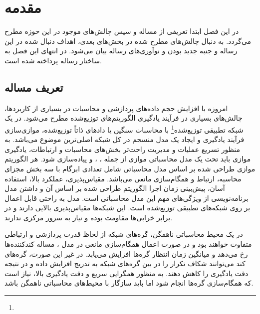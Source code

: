 \chapter{مقدمه}
\newpage
در این فصل ابتدا تعریفی از مساله و سپس چالش‌های موجود در این حوزه مطرح می‌گردد. به دنبال چالش‌های مطرح شده در بخش‌های بعدی، اهداف دنبال شده در این رساله و جنبه‌ جدید بودن و نوآوری‌های رساله بیان می‌شود. در انتهای این فصل به ساختار رساله پرداخته شده است.   
‎\renewcommand{\baselinestretch}{2}\normalsize‎
\label{Introduction}
\section{تعریف مساله}
امروزه با افزایش حجم داده‌های پردازشی و محاسبات در بسیاری از کاربردها، چالش‌های بسیاری در فرآیند یادگیری الگوریتم‌های توزیع‌شده مطرح می‌شود. در یک شبکه تطبیقی توزیع‌شده\footnote{} با محاسبات سنگین  یا داد‌های ذاتاً توزیع‌شده، موازی‌سازی فرآیند یادگیری و ایجاد یک مدل منسجم در کل شبکه اصلی‌ترین موضوع می‌باشد. به منظور تسریع عملیات و مدیریت راحت‌تر بخش‌های محاسبات و ارتباطات، یادگیری موازی باید تحت یک مدل محاسباتی موازی از جمله  ، ،  و  پیاده‌سازی شود. هر الگوریتم موازی طراحی شده بر اساس مدل محاسباتی  شامل تعدادی ابرگام با سه بخش مجزای محاسبه، ارتباط و همگام‌سازی مانعی می‌باشد. مقیاس‌پذیری، عملکرد بالا، استفاده آسان، پیش‌بینی زمان اجرا الگوریتم طراحی شده بر اساس آن و داشتن مدل برنامه‌نویسی از ویژگی‌های مهم این مدل محاسباتی است. مدل  به راحتی قابل اعمال بر روی شبکه‌های تطبیقی توزیع‌شده است. این شبکه‌ها مقیاس‌پذیری بالایی دارند و در برابر خرابی‌ها مقاومت بوده و نیاز به سرور مرکزی ندارند. 

در یک محیط محاسباتی ناهمگن، گره‌های شبکه از لحاظ قدرت پردازشی و ارتباطی متفاوت خواهند بود و در صورت اعمال همگام‌سازی مانعی در مدل ، مساله کندکننده‌ها رخ می‌دهد و میانگین زمان انتظار گره‌ها افزایش می‌یابد. در غیر این صورت، گره‌های کند می‌توانند شکاف تکرار را در بین گره‌های شبکه به تدریج افزایش داده و در نتیجه دقت یادگیری را کاهش دهند. به منظور همگرایی سریع و دقت یادگیری بالا، نیاز است که همگام‌سازی گره‌ها انجام شود اما باید سازگار با محیط‌های محاسباتی ناهمگن باشد.

